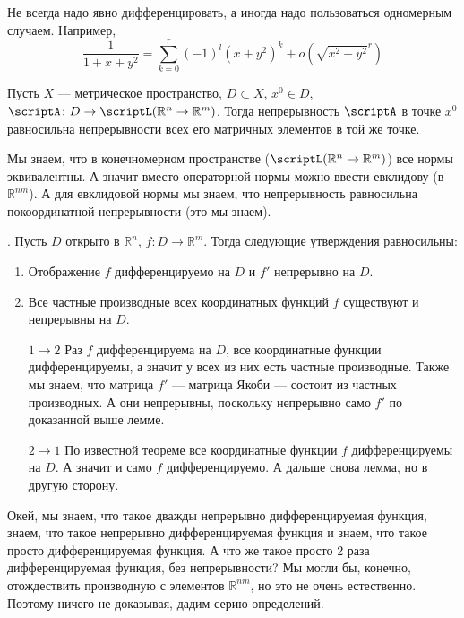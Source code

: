 \documentclass{article}
\begin{document}
\begin{itemize}
        \begin{Example}
            Не всегда надо явно дифференцировать, а иногда надо пользоваться одномерным случаем. Например,
            $$
            \frac1{1+x+y^2}=\sum\limits_{k=0}^r(-1)^l(x+y^2)^k+o(\sqrt{x^2+y^2}^r)
            $$
        \end{Example}
        \dfn Пусть $X$ --- метрическое пространство, $D\subset X$, $x^0\in D$, $\scriptA\colon D\to\scriptL(\mathbb R^n\to\mathbb R^m)$. Тогда непрерывность $\scriptA$ в точке $x^0$ равносильна непрерывности всех его матричных элементов в той же точке.
        \begin{Proof}
            Мы знаем, что в конечномерном пространстве ($\scriptL(\mathbb R^n\to\mathbb R^m)$) все нормы эквивалентны. А значит вместо операторной нормы можно ввести евклидову (в $\mathbb R^{nm}$). А для евклидовой нормы мы знаем, что непрерывность равносильна покоординатной непрерывности (это мы знаем).
        \end{Proof}
        \dfn {}. Пусть $D$ открыто в $\mathbb R^n$, $f\colon D\to\mathbb R^m$. Тогда следующие утверждения равносильны:
        \begin{enumerate}
            \item Отображение $f$ дифференцируемо на $D$ и $f'$ непрерывно на $D$.
            \item Все частные производные всех координатных функций $f$ существуют и непрерывны на $D$.
        \end{enumerate}
        \begin{Proof}
            \begin{itemize}
                \item[$1\to2$] Раз $f$ дифференцируема на $D$, все координатные функции дифференцируемы, а значит у всех из них есть частные производные. Также мы знаем, что матрица $f'$ --- матрица Якоби --- состоит из частных производных. А они непрерывны, поскольку непрерывно само $f'$ по доказанной выше лемме.
                \item[$2\to1$] По известной теореме все координатные функции $f$ дифференцируемы на $D$. А значит и само $f$ дифференцируемо. А дальше снова лемма, но в другую сторону.
            \end{itemize}
        \end{Proof}
        \begin{Comment}
            Окей, мы знаем, что такое дважды непрерывно дифференцируемая функция, знаем, что такое непрерывно дифференцируемая функция и знаем, что такое просто дифференцируемая функция. А что же такое просто 2 раза дифференцируемая функция, без непрерывности? Мы могли бы, конечно, отождествить производную с элементов $\mathbb R^{nm}$, но это не очень естественно. Поэтому ничего не доказывая, дадим серию определений.

\end{Comment}
\end{itemize}
\end{document}
